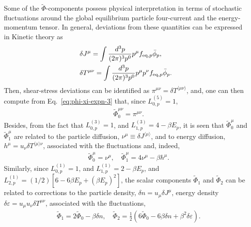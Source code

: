 \documentclass[aps,prd,preprint,nofootinbib,amsmath,amssymb,showpacs,longbibliography,singlecolumn,superscriptaddress,10pt]{revtex4-1}
\theoremstyle{plain}
\theoremstyle{definition}
\begin{document}
%
Some of the $\widetilde{\Phi}$-components possess physical interpretation in terms of stochastic fluctuations around the global equilibrium particle four-current and the energy-momentum tensor. In general, deviations from these quantities can be expressed in Kinetic theory as
%
\begin{equation}
\begin{aligned}
 &
 \delta J^{\mu} = \int \dfrac{d^3 p}{(2\pi)^3 p^0} p^{\mu} f_{\mathrm{eq},p} \Bar{\phi}_{p}, \\
 &
 \delta T^{\mu \nu} = \int \dfrac{d^3 p}{(2\pi)^3 p^0} p^{\mu} p^{\nu} f_{\mathrm{eq},p} \Bar{\phi}_{p}.
\end{aligned}    
\end{equation}
%
Then, shear-stress deviations can be identified as $\pi^{\mu \nu} = \delta T^{\langle \mu \nu \rangle}$, and, one can then compute from Eq.~\eqref{eq:phi-xi-expn-3} that, since $L_{0,p}^{(5)} = 1$,
%
\begin{equation}
\label{eq:shear-as-phi}
\begin{aligned}
&
\widetilde{\Phi}_{0}^{\mu \nu}
= \pi^{\mu \nu}.
\end{aligned}    
\end{equation}
%
Besides, from the fact that  $L^{(3)}_{0, p} = 1$, and $L^{(3)}_{1, p} = 4 - \beta E_{p}$, it is seen that $\widetilde{\Phi}_{0}^{\mu}$ and $\widetilde{\Phi}_{1}^{\mu}$ are related to the particle diffusion, $\nu^{\mu} \equiv \delta J^{\langle \mu \rangle} $, and to energy diffusion, $h^{\mu} = u_{\nu} \delta T^{\langle \mu \rangle \nu}$,  associated with the fluctuations and, indeed,
%
\begin{equation}
\label{eq:vectors-as-phi}
\begin{aligned}
&    
\widetilde{\Phi}_{0}^{\mu} = \nu^{\mu},
\quad
\widetilde{\Phi}_{1}^{\mu} = 4 \nu^{\mu} - \beta h^{\mu}.
\end{aligned}    
\end{equation}
%
Similarly, since $L^{(1)}_{0, p} = 1$, and $L^{(1)}_{1, p} = 2 - \beta E_{p}$, and $L^{(1)}_{2, p} = (1/2)[6 - 6 \beta E_{p} + (\beta E_{p})^{2}]$, the scalar components
$\widetilde{\Phi}_{1}$ and $\widetilde{\Phi}_{2}$ can be related to corrections to the particle density, $\delta n = u_{\mu} \delta J^{\mu}$, energy density $\delta \varepsilon = u_{\mu} u_{\nu} \delta T^{\mu \nu}$, associated with the fluctuations, 
%
\begin{equation}
\label{eq:relations-Phi-phys}
\begin{aligned}
&
\widetilde{\Phi}_{1} = 2 \widetilde{\Phi}_{0} - \beta \delta n,
\quad
\widetilde{\Phi}_{2} = \frac{1}{2} 
\left(6 \widetilde{\Phi}_{0}
-
6 \beta \delta n
+
\beta^{2} \delta \varepsilon
\right). 
\end{aligned}    
\end{equation}
\end{document}

